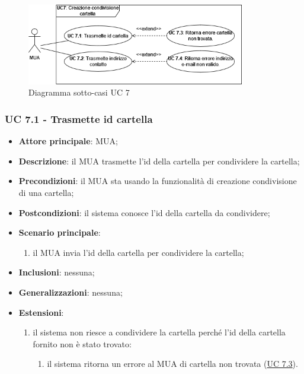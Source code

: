     \begin{figure}[H]
        \includegraphics[width=0.85\textwidth]{sections/uc_imgs/UC07.png}
        \centering
        \caption{Diagramma sotto-casi UC 7}
    \end{figure}

    \subsubsection{UC 7.1 - Trasmette id cartella} \label{sec:UC7.1}
    \begin{itemize}
        \item \textbf{Attore principale}: MUA;
        \item \textbf{Descrizione}: il MUA trasmette l'id della cartella per condividere la cartella;
        \item \textbf{Precondizioni}: il MUA sta usando la funzionalità di creazione condivisione di una cartella;
        \item \textbf{Postcondizioni}: il sistema conosce l'id della cartella da condividere;
        \item \textbf{Scenario principale}:
            \begin{enumerate}
                \item il MUA invia l'id della cartella per condividere la cartella;
            \end{enumerate}
        \item \textbf{Inclusioni}: nessuna;
        \item \textbf{Generalizzazioni}: nessuna;
        \item \textbf{Estensioni}:
            \begin{enumerate}[label=\alph*.]
                \item il sistema non riesce a condividere la cartella perché l'id della cartella fornito non è stato trovato:
                \begin{enumerate}[label=\arabic*.]
                    \item il sistema ritorna un errore al MUA di cartella non trovata (\hyperref[sec:UC7.3]{UC 7.3}).
                \end{enumerate}
            \end{enumerate}
    \end{itemize}


